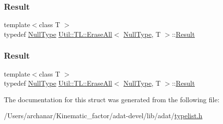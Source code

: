 \mbox{\label{structUtil_1_1TL_1_1EraseAll_3_01NullType_00_01T_01_4_ae8985ba005cb92b28012106353aa56be}} 
\subsubsection{\texorpdfstring{Result}{Result}\hspace{0.1cm}{\footnotesize\ttfamily [2/3]}}
{\footnotesize\ttfamily template$<$class T $>$ \\
typedef \mbox{\hyperlink{classUtil_1_1NullType}{Null\+Type}} \mbox{\hyperlink{structUtil_1_1TL_1_1EraseAll}{Util\+::\+T\+L\+::\+Erase\+All}}$<$ \mbox{\hyperlink{classUtil_1_1NullType}{Null\+Type}}, T $>$\+::\mbox{\hyperlink{structUtil_1_1TL_1_1EraseAll_3_01NullType_00_01T_01_4_ae8985ba005cb92b28012106353aa56be}{Result}}}

\mbox{\label{structUtil_1_1TL_1_1EraseAll_3_01NullType_00_01T_01_4_ae8985ba005cb92b28012106353aa56be}} 
\subsubsection{\texorpdfstring{Result}{Result}\hspace{0.1cm}{\footnotesize\ttfamily [3/3]}}
{\footnotesize\ttfamily template$<$class T $>$ \\
typedef \mbox{\hyperlink{classUtil_1_1NullType}{Null\+Type}} \mbox{\hyperlink{structUtil_1_1TL_1_1EraseAll}{Util\+::\+T\+L\+::\+Erase\+All}}$<$ \mbox{\hyperlink{classUtil_1_1NullType}{Null\+Type}}, T $>$\+::\mbox{\hyperlink{structUtil_1_1TL_1_1EraseAll_3_01NullType_00_01T_01_4_ae8985ba005cb92b28012106353aa56be}{Result}}}



The documentation for this struct was generated from the following file\+:\begin{DoxyCompactItemize}
\item 
/\+Users/archanar/\+Kinematic\+\_\+factor/adat-\/devel/lib/adat/\mbox{\hyperlink{adat-devel_2lib_2adat_2typelist_8h}{typelist.\+h}}\end{DoxyCompactItemize}
